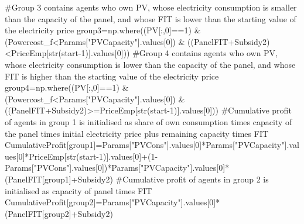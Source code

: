 \documentclass[
  letterpaper,
  DIV=11,
  numbers=noendperiod]{scrartcl}
\newenvironment{Shaded}{\begin{snugshade}}{\end{snugshade}}
\newcommand{\BuiltInTok}[1]{\textcolor[rgb]{0.00,0.23,0.31}{#1}}
\newcommand{\CommentTok}[1]{\textcolor[rgb]{0.37,0.37,0.37}{#1}}
\newcommand{\DecValTok}[1]{\textcolor[rgb]{0.68,0.00,0.00}{#1}}
\newcommand{\NormalTok}[1]{\textcolor[rgb]{0.00,0.23,0.31}{#1}}
\newcommand{\OperatorTok}[1]{\textcolor[rgb]{0.37,0.37,0.37}{#1}}
\newcommand{\StringTok}[1]{\textcolor[rgb]{0.13,0.47,0.30}{#1}}
\begin{document}
\begin{Shaded}
\begin{Highlighting}[]
    \CommentTok{\#Group 3 contains agents who own PV, whose electricity consumption is smaller than the capacity of the panel, and whose FIT is lower than the starting value of the electricity price}
\NormalTok{    group3}\OperatorTok{=}\NormalTok{np.where((PV[:,}\DecValTok{0}\NormalTok{]}\OperatorTok{==}\DecValTok{1}\NormalTok{) }\OperatorTok{\&}\NormalTok{ (Powercost\_f}\OperatorTok{\textless{}}\NormalTok{Params[}\StringTok{"PVCapacity"}\NormalTok{].values[}\DecValTok{0}\NormalTok{]) }\OperatorTok{\&}\NormalTok{ ((PanelFIT}\OperatorTok{+}\NormalTok{Subsidy2)}\OperatorTok{\textless{}}\NormalTok{PriceEmp[}\BuiltInTok{str}\NormalTok{(start}\OperatorTok{{-}}\DecValTok{1}\NormalTok{)].values[}\DecValTok{0}\NormalTok{]))}
    \CommentTok{\#Group 4 contains agents who own PV, whose electricity consumption is lower than the capacity of the panel, and whose FIT is higher than the starting value of the electricity price}
\NormalTok{    group4}\OperatorTok{=}\NormalTok{np.where((PV[:,}\DecValTok{0}\NormalTok{]}\OperatorTok{==}\DecValTok{1}\NormalTok{) }\OperatorTok{\&}\NormalTok{ (Powercost\_f}\OperatorTok{\textless{}}\NormalTok{Params[}\StringTok{"PVCapacity"}\NormalTok{].values[}\DecValTok{0}\NormalTok{]) }\OperatorTok{\&}\NormalTok{ ((PanelFIT}\OperatorTok{+}\NormalTok{Subsidy2)}\OperatorTok{\textgreater{}=}\NormalTok{PriceEmp[}\BuiltInTok{str}\NormalTok{(start}\OperatorTok{{-}}\DecValTok{1}\NormalTok{)].values[}\DecValTok{0}\NormalTok{]))}
    \CommentTok{\#Cumulative profit of agents in group 1 is initialised as share of own consumption times capacity of the panel times initial electricity price plus remaining capacity times FIT}
\NormalTok{    CumulativeProfit[group1]}\OperatorTok{=}\NormalTok{Params[}\StringTok{"PVCons"}\NormalTok{].values[}\DecValTok{0}\NormalTok{]}\OperatorTok{*}\NormalTok{Params[}\StringTok{"PVCapacity"}\NormalTok{].values[}\DecValTok{0}\NormalTok{]}\OperatorTok{*}\NormalTok{PriceEmp[}\BuiltInTok{str}\NormalTok{(start}\OperatorTok{{-}}\DecValTok{1}\NormalTok{)].values[}\DecValTok{0}\NormalTok{]}\OperatorTok{+}\NormalTok{(}\DecValTok{1}\OperatorTok{{-}}\NormalTok{Params[}\StringTok{"PVCons"}\NormalTok{].values[}\DecValTok{0}\NormalTok{])}\OperatorTok{*}\NormalTok{Params[}\StringTok{"PVCapacity"}\NormalTok{].values[}\DecValTok{0}\NormalTok{]}\OperatorTok{*}\NormalTok{(PanelFIT[group1]}\OperatorTok{+}\NormalTok{Subsidy2)}
    \CommentTok{\#Cumulative profit of agents in group 2 is initialised as capacity of panel times FIT}
\NormalTok{    CumulativeProfit[group2]}\OperatorTok{=}\NormalTok{Params[}\StringTok{"PVCapacity"}\NormalTok{].values[}\DecValTok{0}\NormalTok{]}\OperatorTok{*}\NormalTok{(PanelFIT[group2]}\OperatorTok{+}\NormalTok{Subsidy2)}

\end{Highlighting}
\end{Shaded}
\end{document}
